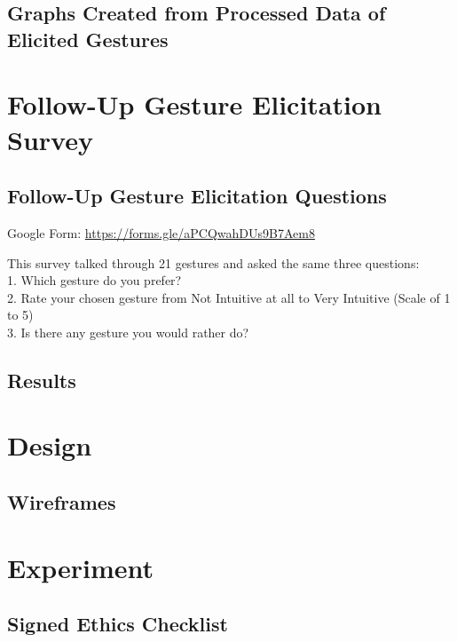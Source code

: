\documentclass{l4proj}
\begin{document}
\begin{appendices}
\section{Graphs Created from Processed Data of Elicited Gestures}
\label{section:graphsGE}


\chapter{Follow-Up Gesture Elicitation Survey}
\section{Follow-Up Gesture Elicitation Questions}
\label{section:followUpGEQu}
Google Form: \url{https://forms.gle/aPCQwahDUs9B7Aem8}

This survey talked through 21 gestures and asked the same three questions:\\
1. Which gesture do you prefer?\\
2. Rate your chosen gesture from Not Intuitive at all to Very Intuitive (Scale of 1 to 5)\\
3. Is there any gesture you would rather do?\\

\section{Results}
\label{section:followUpGEResults}



\chapter{Design}
\section{Wireframes}
\label{section:wireframes}


\chapter{Experiment}
\section{Signed Ethics Checklist}
\label{section:checklistJan21}



\end{appendices}
\end{document}
